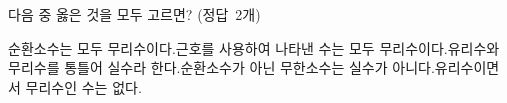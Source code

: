 다음 중 옳은 것을 모두 고르면? \mbox{(정답 2개)}
\begin{choicesv}{순환소수는 모두 무리수이다.}{근호를 사용하여 나타낸 수는 모두 무리수이다.}{유리수와 무리수를 통틀어 실수라 한다.}{순환소수가 아닌 무한소수는 실수가 아니다.}{유리수이면서 무리수인 수는 없다.}\end{choicesv}
